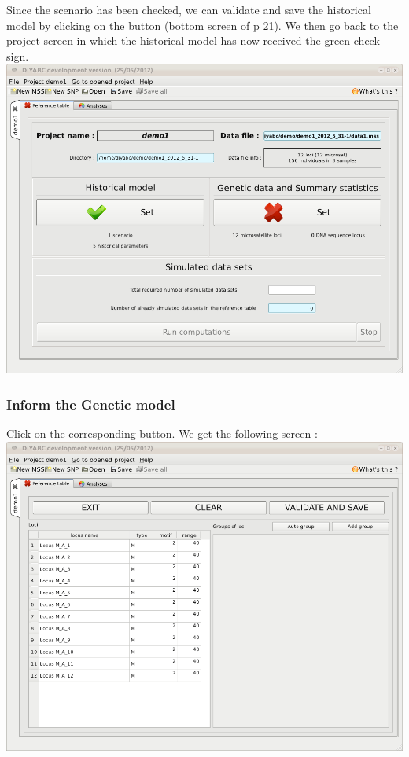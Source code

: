 Since the scenario has been checked, we can validate and save the
historical model by clicking on the 
button (bottom screen of p 21). We then go back to the project screen
in which the historical model has now received the green check sign.\\


\includegraphics[scale=0.35]{gui_pictures/Capture-DIYABC-14}

\newpage{}


\subsubsection{Inform the Genetic model}

Click on the corresponding  button. We get the
following screen : \\


\includegraphics[scale=0.35]{gui_pictures/Capture-DIYABC-15}

